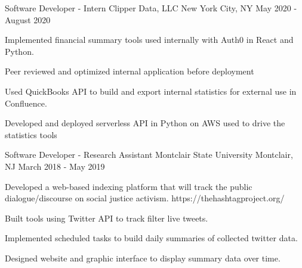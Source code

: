 

\begin{cventries}

  \cventry
    {Software Developer - Intern} %
    {Clipper Data, LLC} %
    {New York City, NY} %
    {May 2020 - August 2020} %
    {
      \begin{cvitems} %
        \item {Implemented financial summary tools used internally with Auth0 in React and Python.}
        \item {Peer reviewed and optimized internal application before deployment}
        \item {Used QuickBooks API to build and export internal statistics for external use in Confluence.}
        \item {Developed and deployed serverless API in Python on AWS used to drive the statistics tools}
      \end{cvitems}
    }
  \cventry
    {Software Developer - Research Assistant} %
    {Montclair State University} %
    {Montclair, NJ} %
    {March 2018 - May 2019} %
    {
      \begin{cvitems} %
        \item Developed a web-based indexing platform that will track the public dialogue/discourse on social justice activism. https://thehashtagproject.org/
        \item Built tools using Twitter API to track filter live tweets.
        \item Implemented scheduled tasks to build daily summaries of collected twitter data.
        \item Designed website and graphic interface to display summary data over time.
      \end{cvitems}
    }
\end{cventries}
